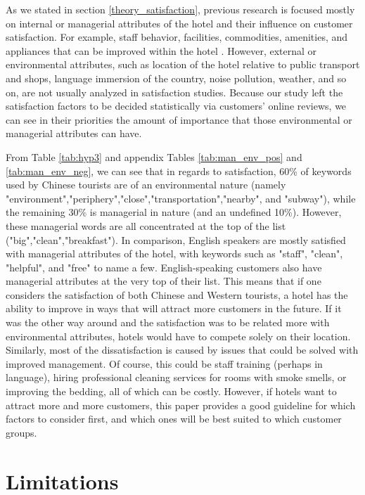 As we stated in section \ref{theory_satisfaction}, previous research is focused mostly on internal or managerial attributes of the hotel and their influence on customer satisfaction. For example, staff behavior, facilities, commodities, amenities, and appliances that can be improved within the hotel \cite[e.g.][]{shanka2004, choi2001}. However, external or environmental attributes, such as location of the hotel relative to public transport and shops, language immersion of the country, noise pollution, weather, and so on, are not usually analyzed in satisfaction studies. Because our study left the satisfaction factors to be decided statistically via customers' online reviews, we can see in their priorities the amount of importance that those environmental or managerial attributes can have. 

From Table \ref{tab:hyp3} and appendix Tables \ref{tab:man_env_pos} and \ref{tab:man_env_neg}, we can see that in regards to satisfaction, 60\% of keywords used by Chinese tourists are of an environmental nature (namely "environment","periphery","close","transportation","nearby", and "subway"), while the remaining 30\% is managerial in nature (and an undefined 10\%). However, these managerial words are all concentrated at the top of the list ("big","clean","breakfast"). In comparison, English speakers are mostly satisfied with managerial attributes of the hotel, with keywords such as "staff", "clean", "helpful", and "free" to name a few. English-speaking customers also have managerial attributes at the very top of their list. This means that if one considers the satisfaction of both Chinese and Western tourists, a hotel has the ability to improve in ways that will attract more customers in the future. If it was the other way around and the satisfaction was to be related more with environmental attributes, hotels would have to compete solely on their location. Similarly, most of the dissatisfaction is caused by issues that could be solved with improved management. Of course, this could be staff training (perhaps in language), hiring professional cleaning services for rooms with smoke smells, or improving the bedding, all of which can be costly. However, if hotels want to attract more and more customers, this paper provides a good guideline for which factors to consider first, and which ones will be best suited to which customer groups.

\section{Limitations}\label{limitations}

